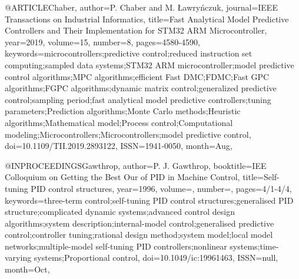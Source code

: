 @ARTICLE{Chaber,
author={P. {Chaber} and M. {Ławryńczuk}},
journal={IEEE Transactions on Industrial Informatics},
title={Fast Analytical Model Predictive Controllers and Their Implementation for STM32 ARM Microcontroller},
year={2019},
volume={15},
number={8},
pages={4580-4590},
keywords={microcontrollers;predictive control;reduced instruction set computing;sampled data systems;STM32 ARM microcontroller;model predictive control algorithms;MPC algorithms;efficient Fast DMC;FDMC;Fast GPC algorithms;FGPC algorithms;dynamic matrix control;generalized predictive control;sampling period;fast analytical model predictive controllers;tuning parameters;Prediction algorithms;Monte Carlo methods;Heuristic algorithms;Mathematical model;Process control;Computational modeling;Microcontrollers;Microcontrollers;model predictive control},
doi={10.1109/TII.2019.2893122},
ISSN={1941-0050},
month={Aug},}

@INPROCEEDINGS{Gawthrop,
author={P. J. {Gawthrop}},
booktitle={IEE Colloquium on Getting the Best Our of PID in Machine Control},
title={Self-tuning PID control structures},
year={1996},
volume={},
number={},
pages={4/1-4/4},
keywords={three-term control;self-tuning PID control structures;generalised PID structure;complicated dynamic systems;advanced control design algorithms;system description;internal-model control;generalised predictive control;controller tuning;rational design method;system model;local model networks;multiple-model self-tuning PID controllers;nonlinear systems;time-varying systems;Proportional control},
doi={10.1049/ic:19961463},
ISSN={null},
month={Oct},}